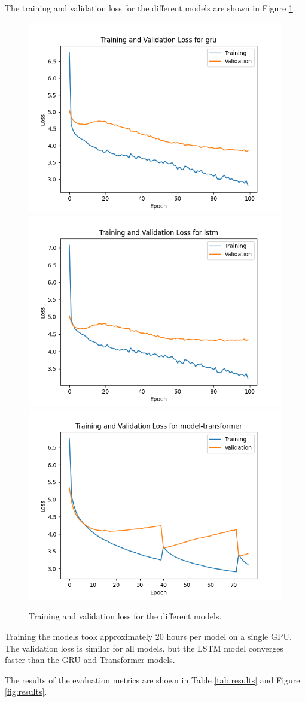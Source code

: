 \documentclass[12pt]{article}
\theoremstyle{plain}
\theoremstyle{definition}
\theoremstyle{remark}
\begin{document}
The training and validation loss for the different models are shown in Figure \ref{fig:loss}.
\begin{figure}[H]
    \centering
    \includegraphics[width=.3\textwidth]{res/training-gru.png}
    \includegraphics[width=.3\textwidth]{res/training-lstm.png}
    \includegraphics[width=.3\textwidth]{res/training-transformer.png}
    \caption{Training and validation loss for the different models.}\label{fig:loss}
\end{figure}
Training the models took approximately 20 hours per model on a single GPU. The validation loss is similar for all models, but the LSTM model converges faster than the GRU and Transformer models.

The results of the evaluation metrics are shown in Table \ref{tab:results} and Figure \ref{fig:results}.
\end{document}
